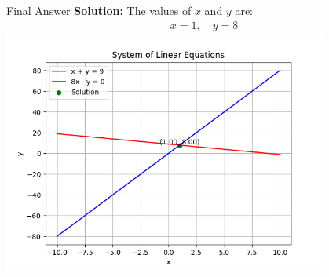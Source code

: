 \documentclass{beamer}
\begin{document}
\begin{frame}{Final Answer}
    \textbf{Solution:} The values of $x$ and $y$ are:
    \begin{align}
        x = 1, \quad y = 8
    \end{align}
    \centering
    \includegraphics[width=0.8\textwidth]{figs/fig.png}
\end{frame}
\end{document}
